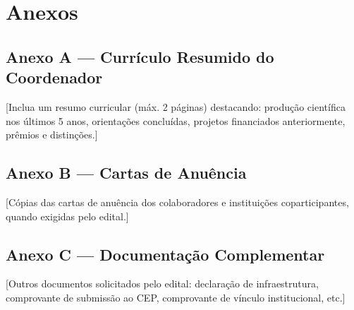 \documentclass[
  12pt,
  a4paper,
  oneside,
  english,      %
  brazil
]{article}
\begin{document}
\section*{Anexos}

\subsection*{Anexo A — Currículo Resumido do Coordenador}
[Inclua um resumo curricular (máx. 2 páginas) destacando:
produção científica nos últimos 5 anos, orientações concluídas,
projetos financiados anteriormente, prêmios e distinções.]

\vspace{0.5cm}
\subsection*{Anexo B — Cartas de Anuência}
[Cópias das cartas de anuência dos colaboradores e instituições
coparticipantes, quando exigidas pelo edital.]

\vspace{0.5cm}
\subsection*{Anexo C — Documentação Complementar}
[Outros documentos solicitados pelo edital: declaração de
infraestrutura, comprovante de submissão ao CEP, comprovante de
vínculo institucional, etc.]

\end{document}
